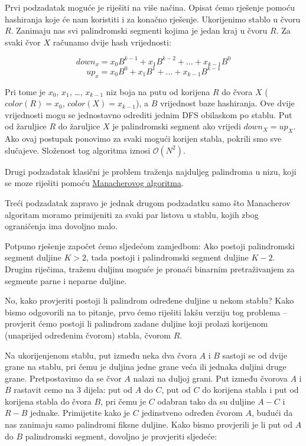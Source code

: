 \documentclass[a4paper]{article}
\begin{document}
Prvi podzadatak moguće je riješiti na više načina. Opisat ćemo rješenje pomoću
hashiranja koje će nam koristiti i za konačno rješenje. Ukorijenimo stablo u
čvoru $R$. Zanimaju nas svi palindromski segmenti kojima je jedan kraj u čvoru
$R$.
Za svaki čvor $X$ računamo dvije hash vrijednosti:

\[down_x = x_0B^{k-1} + x_1B^{k-2} + \dots + x_{k-1}B^0\]
\[up_x = x_0B^0 + x_1B^1 + \dots + x_{k-1}B^{k-1}\]

Pri tome je $x_0$, $x_1$, \dots, $x_{k-1}$ niz boja na putu od korijena $R$ do
čvora $X$ ($color(R) = x_0$, $color(X) = x_{k-1}$), a $B$ vrijednost baze
hashiranja. Ove dvije vrijednosti mogu se jednostavno odrediti jednim DFS
obilaskom po stablu. Put od žaruljice $R$ do žaruljice $X$ je palindromski
segment ako vrijedi $down_X = up_X$.  Ako ovaj postupak ponovimo za svaki
mogući korijen stabla, pokrili smo sve slučajeve. Složenost tog algoritma
iznosi $\mathcal{O}(N^2)$.

Drugi podzadatak klasični je problem traženja najduljeg palindroma u nizu, koji
se moze riješiti pomoću
\href{https://en.wikipedia.org/wiki/Longest_palindromic_substring}{Manacherovog
algoritma}.

Treći podzadatak zapravo je jednak drugom podzadatku samo što Manacherov algoritam
moramo primijeniti za svaki par listova u stablu, kojih zbog ograničenja ima
dovoljno malo.

Potpuno rješenje započet ćemo sljedećom zamjedbom: Ako postoji palindromski
segment duljine $K > 2$, tada postoji i palindromski segment duljine $K - 2$.
Drugim riječima, traženu duljinu moguće je pronaći binarnim pretraživanjem za
segmente parne i neparne duljine.

No, kako provjeriti postoji li palindrom određene duljine u nekom stablu? Kako
bismo odgovorili na to pitanje, prvo ćemo riješiti lakšu verziju tog problema --
provjerit ćemo postoji li palindrom zadane duljine koji prolazi korijenom
(unaprijed određenim čvorom) stabla, čvorom $R$.

Na ukorijenjenom stablu, put između neka dva čvora $A$ i $B$ sastoji se od
dvije grane na stablu, pri čemu je duljina jedne grane veća ili jednaka duljini
druge grane. Pretpostavimo da se čvor $A$ nalazi na duljoj grani. Put između
čvorova $A$ i $B$ rastavit cemo na $3$ dijela: put od $A$ do $C$, put od $C$ do
korijena stabla i put od korijena stabla do čvora $B$, pri čemu je $C$ odabran
tako da su duljine $A-C$ i $R-B$ jednake. Primijetite kako je $C$ jedinstveno
određen čvorom $A$, budući da nas zanimaju samo palindromi fiksne duljine. Kako
bismo provjerili je li put od $A$ do $B$ palindromski segment, dovoljno je
provjeriti sljedeće:
\end{document}
